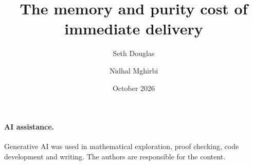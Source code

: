 \documentclass[11pt,a4paper]{article}
\title{The memory and purity cost of immediate delivery}
\author{Seth Douglas \and Nidhal Mghirbi}
\date{October 2026}
\theoremstyle{plain}
\theoremstyle{definition}
\theoremstyle{remark}
\begin{document}
\maketitle



\clearpage
\setcounter{tocdepth}{1}
{\small\tableofcontents}
\clearpage











\paragraph{AI assistance.}
Generative AI was used in mathematical exploration, proof checking, code development and writing. The authors are
responsible for the content.

\clearpage
\appendix





















\clearpage
{\small}
\end{document}
